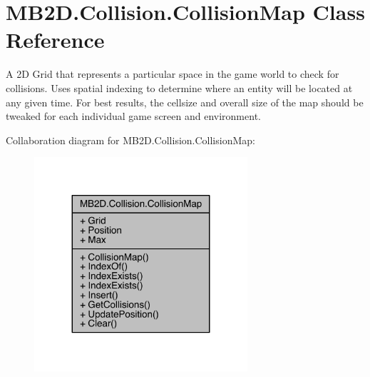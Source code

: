 \hypertarget{class_m_b2_d_1_1_collision_1_1_collision_map}{}\section{M\+B2\+D.\+Collision.\+Collision\+Map Class Reference}
\label{class_m_b2_d_1_1_collision_1_1_collision_map}


A 2D Grid that represents a particular space in the game world to check for collisions. Uses spatial indexing to determine where an entity will be located at any given time. For best results, the cellsize and overall size of the map should be tweaked for each individual game screen and environment.  




Collaboration diagram for M\+B2\+D.\+Collision.\+Collision\+Map\+:
\nopagebreak
\begin{figure}[H]
\begin{center}
\leavevmode
\includegraphics[width=224pt]{class_m_b2_d_1_1_collision_1_1_collision_map__coll__graph}
\end{center}
\end{figure}
